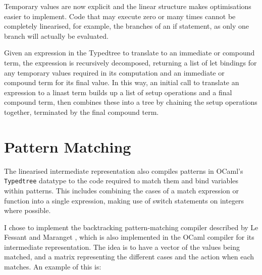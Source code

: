 Temporary values are now explicit and the linear structure makes optimisations easier to implement. Code that may execute zero or many times cannot be completely linearised, for example, the branches of an if statement, as only one branch will actually be evaluated. 

Given an expression in the Typedtree to translate to an immediate or compound term, the expression is recursively decomposed, returning a list of let bindings for any temporary values required in its computation and an immediate or compound term for its final value. In this way, an initial call to translate an expression to a linast term builds up a list of setup operations and a final compound term, then combines these into a tree by chaining the setup operations together, terminated by the final compound term.




\section{Pattern Matching}
The linearised intermediate representation also compiles patterns in OCaml's \verb|Typedtree| datatype to the code required to match them and bind variables within patterns. This includes combining the cases of a match expression or function into a single expression, making use of switch statements on integers where possible. 

I chose to implement the backtracking pattern-matching compiler described by Le Fessant and Maranget \cite{ocamlpatternmatch}, which is also implemented in the OCaml compiler for its intermediate representation. 
The idea is to have a vector of the values being matched, and a matrix representing the different cases and the action when each matches. An example of this is:

